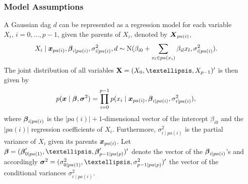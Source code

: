 \subsubsection*{Model Assumptions }

A Gaussian dag $d$ can be represented as a regression model for
each variable $X_i, \, i=0, \dots, p-1$, given the parents of
$X_i$, denoted by $\mbox{\boldmath $X$}_{pa(i)}$,
%
\begin{eqnarray}
X_i \mid \mbox{\boldmath $x$}_{pa(i)},  \mbox{\boldmath $\beta$}_{i \mid pa(i)}, \sigma_{i \mid
pa(i)}^2, d \sim  \mbox{N}(\beta_{i0} + \sum_{x_l \in pa(x_i)}
\beta_{il}x_l, \sigma_{i \mid pa(i)}^2). \nonumber
\end{eqnarray}
%
The joint distribution of all variables ${\bf X} = (X_0, \dots,
X_{p-1})'$ is then given by
%
\begin{eqnarray}
p(\mbox{\boldmath $x$} \mid  \mbox{\boldmath $\beta$}, \mbox{\boldmath $\sigma$}^2) = \prod_{i=0}^{p-1} p(x_i \mid
\mbox{\boldmath $x$}_{pa(i)}, \mbox{\boldmath $\beta$}_{i \mid pa(i)}, \sigma_{i \mid pa(i)}^2),
\nonumber
\end{eqnarray}
%
where $\mbox{\boldmath $\beta$}_{i \mid pa(i)}$ is the $|pa(i)|+1$-dimensional
vector of the intercept $\beta_{i0}$ and the $|pa(i)|$ regression
coefficients of $X_i$. Furthermore, $\sigma_{i \mid pa(i)}^2$ is
the partial variance of $X_i$ given its parents $\mbox{\boldmath $x$}_{pa(i)}$. Let
$\mbeta = (\mbeta'_{0 \mid pa(1)}, \dots, \mbeta'_{p-1 \mid
pa(p)})'$ denote the vector of the $\mbox{\boldmath $\beta$}_{i \mid pa(i)}$'s and
accordingly $\msigma^2 = (\sigma_{0 \mid pa(1)}^2, \dots,
\sigma_{p-1 \mid pa(p)}^2)'$ the vector of the conditional
variances $\sigma_{i \mid pa(i)}^2$.

\bigskip

